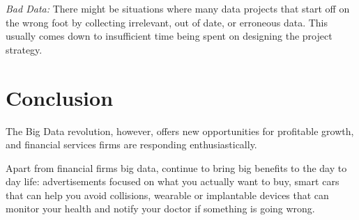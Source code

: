 \documentclass[sigconf]{acmart}
\begin{document}
\textit{Bad Data:} There might be situations where many data projects that start off on the wrong foot by collecting irrelevant, out of date, or erroneous data. This usually comes down to insufficient time being spent on designing the project strategy.


\section{Conclusion}
The Big Data revolution, however, offers new opportunities
for profitable growth, and financial services firms are responding enthusiastically. 

Apart from financial firms big data, continue to bring big benefits to the day to day life: advertisements focused on what you actually want to buy, smart cars that can help you avoid collisions, wearable or implantable devices that can monitor your health and notify your doctor if something is going wrong. 



 
\end{document}
